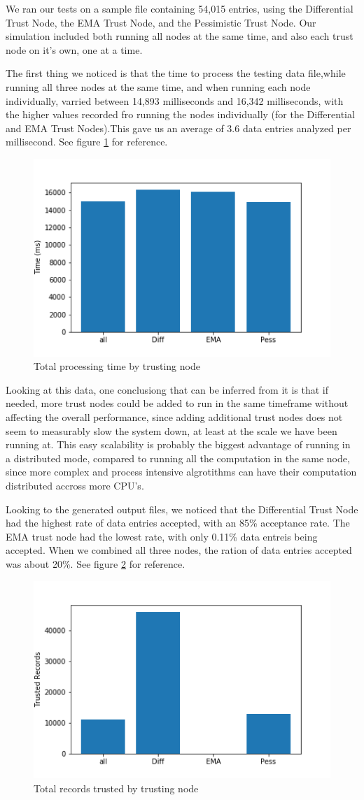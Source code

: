 \documentclass[11pt]{article}
\begin{document}
We ran our tests on a sample file containing 54,015 entries, using the Differential Trust Node, the EMA Trust Node, and the Pessimistic Trust Node. Our simulation included both running all nodes at the same time, and also each trust node on it's own, one at a time.

The first thing we noticed is that the time to process the testing data file,while running all three nodes at the same time, and when running each node individually, varried between 14,893 milliseconds and 16,342 milliseconds, with the higher values recorded fro running the nodes individually (for the Differential and EMA Trust Nodes).This gave us an average of 3.6 data entries analyzed per millisecond. See figure \ref{times} for reference.

\begin{figure}
  \centering
  \includegraphics[width=.5\textwidth]{pics/times.png}
  \caption{Total processing time by trusting node}
  \label{times}
\end{figure}

Looking at this data, one conclusiong that can be inferred from it is that if needed, more trust nodes could be added to run in the same timeframe without affecting the overall performance, since adding additional trust nodes does not seem to measurably slow the system down, at least at the scale we have been running at. This easy scalability is probably the biggest advantage of running in a distributed mode, compared to running all the computation in the same node, since more complex and process intensive algrotithms can have their computation distributed accross more CPU's.

Looking to the generated output files, we noticed that the Differential Trust Node had the highest rate of data entries accepted, with an 85\% acceptance rate. The EMA trust node had the lowest rate, with only 0.11\% data entreis being accepted. When we combined all three nodes, the ration of data entries accepted was about 20\%. See figure \ref{outs} for reference.

\begin{figure}
  \centering
  \includegraphics[width=.5\textwidth]{pics/outs.png}
  \caption{Total records trusted by trusting node}
  \label{outs}
\end{figure}
\end{document}
